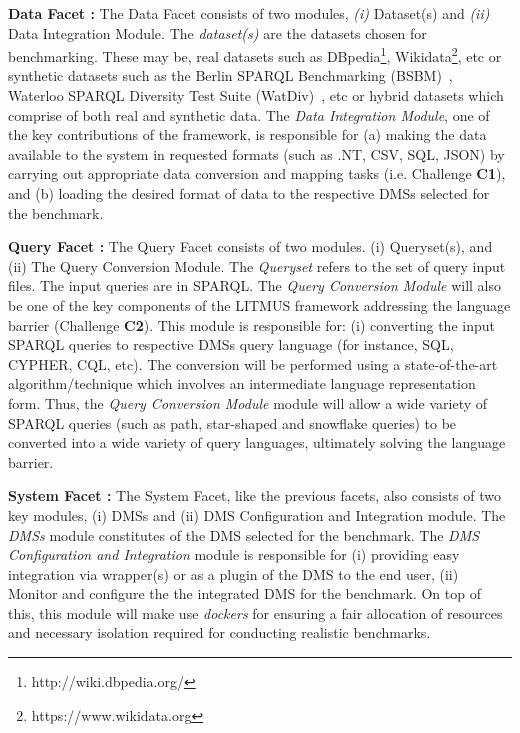\documentclass{llncs}
\begin{document}
\begin{itemize}[nosep]
        \textbf{Data Facet :} The Data Facet consists of two modules, \textit{(i)} Dataset(s) and \textit{(ii)} Data Integration Module. The \textit{dataset(s)} are the datasets chosen for benchmarking. These may be, real datasets such as DBpedia\footnote{http://wiki.dbpedia.org/}, Wikidata\footnote{https://www.wikidata.org}, etc or synthetic datasets such as the Berlin SPARQL Benchmarking (BSBM)~\cite{bizer2008benchmarking,bizer2009berlin}, Waterloo SPARQL Diversity Test Suite (WatDiv)~\cite{alucc2014diversified}, etc or hybrid datasets which comprise of both real and synthetic data. 
        The \textit{Data Integration Module}, one of the key contributions of the framework, is responsible for (a) making the data available to the system in requested formats (such as .NT, CSV, SQL, JSON) by carrying out appropriate data conversion and mapping tasks (i.e. Challenge \textbf{C1}), and (b) loading the desired format of data to the respective DMSs selected for the benchmark. 
        
        \textbf{Query Facet :} The Query Facet consists of two modules. (i) Queryset(s), and (ii) The Query Conversion Module. The \textit{Queryset} refers to the set of query input files. The input queries are in SPARQL. The \textit{Query Conversion Module} will also be one of the key components of the LITMUS framework addressing the language barrier (Challenge \textbf{C2}). This module is responsible for: (i) converting the input SPARQL queries to respective DMSs query language (for instance, SQL, CYPHER, CQL, etc). The conversion will be performed using a state-of-the-art algorithm/technique which involves an intermediate language representation form. Thus, the \textit{Query Conversion Module} module will allow a wide variety of SPARQL queries (such as path, star-shaped and snowflake queries) to be converted into a wide variety of query languages, ultimately solving the language barrier.
        
        \textbf{System Facet :} The System Facet, like the previous facets, also consists of two key modules, (i) DMSs and (ii) DMS Configuration and Integration module. The \textit{DMSs} module  constitutes of the DMS selected for the benchmark. The \textit{DMS Configuration and Integration} module is responsible for (i) providing easy integration via wrapper(s) or as a plugin of the DMS to the end user, (ii) Monitor and configure the the integrated DMS for the benchmark. On top of this, this module will make use \textit{dockers} for ensuring a fair allocation of resources and necessary isolation required for conducting realistic benchmarks. 
        

\end{itemize}
\end{document}
